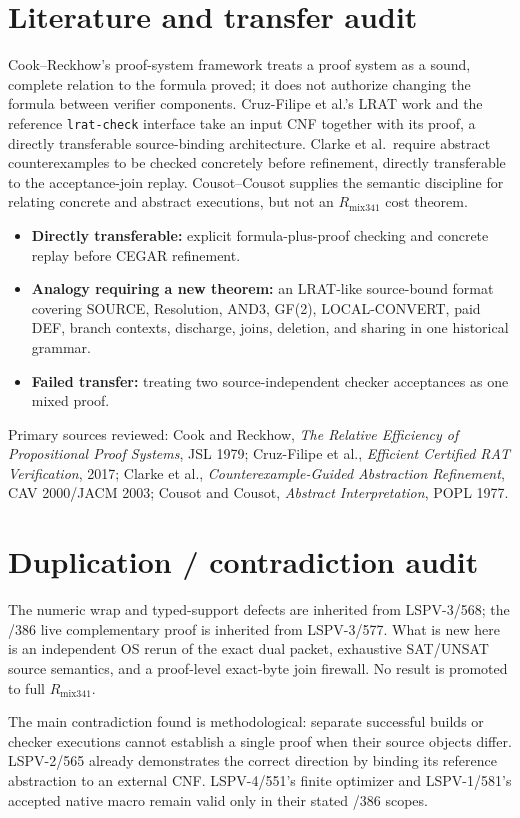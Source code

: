 \documentclass[11pt]{article}
\begin{document}
\section*{Literature and transfer audit}
Cook--Reckhow's proof-system framework treats a proof system as a sound,
complete relation to the formula proved; it does not authorize changing
the formula between verifier components. Cruz-Filipe et al.'s LRAT work
and the reference \texttt{lrat-check} interface take an input CNF together
with its proof, a directly transferable source-binding architecture.
Clarke et al.\ require abstract counterexamples to be checked concretely
before refinement, directly transferable to the acceptance-join replay.
Cousot--Cousot supplies the semantic discipline for relating concrete and
abstract executions, but not an \(R_{\mathrm{mix341}}\) cost theorem.

\begin{itemize}
\item \textbf{Directly transferable:} explicit formula-plus-proof checking
and concrete replay before CEGAR refinement.
\item \textbf{Analogy requiring a new theorem:} an LRAT-like source-bound
format covering SOURCE, Resolution, AND3, GF(2), LOCAL-CONVERT, paid DEF,
branch contexts, discharge, joins, deletion, and sharing in one historical
grammar.
\item \textbf{Failed transfer:} treating two source-independent checker
acceptances as one mixed proof.
\end{itemize}

Primary sources reviewed:
Cook and Reckhow, \emph{The Relative Efficiency of Propositional Proof
Systems}, JSL 1979; Cruz-Filipe et al., \emph{Efficient Certified RAT
Verification}, 2017; Clarke et al., \emph{Counterexample-Guided Abstraction
Refinement}, CAV 2000/JACM 2003; Cousot and Cousot,
\emph{Abstract Interpretation}, POPL 1977.

\section*{Duplication / contradiction audit}
The numeric wrap and typed-support defects are inherited from LSPV-3/568;
the /386 live complementary proof is inherited from LSPV-3/577. What is
new here is an independent OS rerun of the exact dual packet, exhaustive
SAT/UNSAT source semantics, and a proof-level exact-byte join firewall.
No result is promoted to full \(R_{\mathrm{mix341}}\).

The main contradiction found is methodological: separate successful builds
or checker executions cannot establish a single proof when their source
objects differ. LSPV-2/565 already demonstrates the correct direction by
binding its reference abstraction to an external CNF. LSPV-4/551's finite
optimizer and LSPV-1/581's accepted native macro remain valid only in their
stated /386 scopes.
\end{document}
